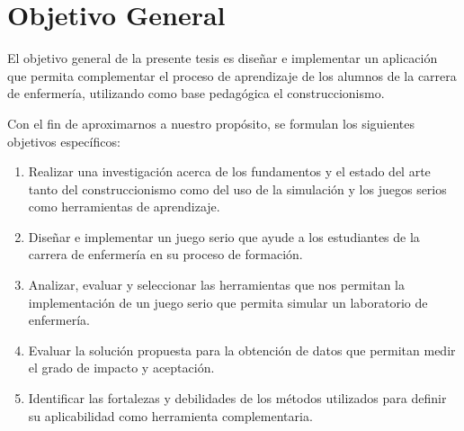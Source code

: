 \section{Objetivo General}

El objetivo general de la presente tesis es diseñar e implementar un aplicación
que permita complementar el proceso de aprendizaje de los alumnos de la carrera
de enfermería, utilizando como base pedagógica el construccionismo.

Con el fin de aproximarnos a nuestro propósito, se formulan los siguientes
objetivos específicos:

\begin{enumerate}
\item Realizar una investigación acerca de los fundamentos y el estado del arte
    tanto del construccionismo como del uso de la simulación y los juegos serios
    como herramientas de aprendizaje.

\item Diseñar e implementar un juego serio que ayude a los estudiantes de la
    carrera de enfermería en su proceso de formación.

\item Analizar, evaluar y seleccionar las herramientas que nos permitan la
    implementación de un juego serio que permita simular un laboratorio de
    enfermería.

\item Evaluar la solución propuesta para la obtención de datos que permitan
    medir el grado de impacto y aceptación.

\item Identificar las fortalezas y debilidades de los métodos utilizados para
    definir su aplicabilidad como herramienta complementaria. 

\end{enumerate}
